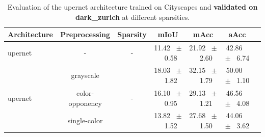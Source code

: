 \begin{table}[h]
  \centering
  \caption{Evaluation of the upernet architecture trained on Cityscapes and \textbf{validated on dark_zurich} at different sparsities.}
  \begin{tabular}{@{}lccc ccc@{}}
    \toprule
    Architecture & Preprocessing & Sparsity & mIoU & mAcc & aAcc \\
    \midrule
    upernet & - & - & 11.42 ~$\pm$~ 0.58 & 21.92 ~$\pm$~ 2.60 & 42.86 ~$\pm$~ 6.74 \\
    \midrule
    \midrule
    \multirow{3}{*}{upernet} & grayscale & \multirow{3}{*}{-} & 18.03 ~$\pm$~ 1.82 & 32.15 ~$\pm$~ 1.79 & 50.00 ~$\pm$~ 1.10 \\
    & color-opponency & & 16.10 ~$\pm$~ 0.95 & 29.13 ~$\pm$~ 1.21 & 46.56 ~$\pm$~ 4.08 \\
    & single-color & & 13.82 ~$\pm$~ 1.52 & 27.68 ~$\pm$~ 1.50 & 44.06 ~$\pm$~ 3.62 \\
    \midrule
    \bottomrule
  \end{tabular}
  \label{tab:sparse_upernet_dark_zurich}
\end{table}